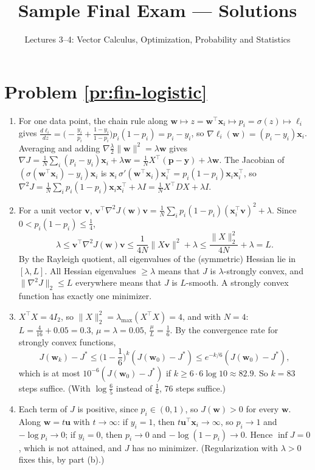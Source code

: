 \documentclass[11pt]{article}
\title{Sample Final Exam --- Solutions}
\author{Lectures 3--4: Vector Calculus, Optimization, Probability and Statistics}
\date{}
\newcommand{\norm}[1]{\lVert #1 \rVert}
\begin{document}
\maketitle

\section*{Problem \ref{pr:fin-logistic}}

\begin{enumerate}[label=(\alph*)]
    \item For one data point, the chain rule along $\mathbf{w} \mapsto z = \mathbf{w}^\top\mathbf{x}_i \mapsto p_i = \sigma(z) \mapsto \ell_i$ gives $\frac{d\ell_i}{dz} = \big(-\frac{y_i}{p_i} + \frac{1 - y_i}{1 - p_i}\big)p_i(1 - p_i) = p_i - y_i$, so $\nabla\ell_i(\mathbf{w}) = (p_i - y_i)\mathbf{x}_i$. Averaging and adding $\nabla\frac{\lambda}{2}\norm{\mathbf{w}}^2 = \lambda\mathbf{w}$ gives $\nabla J = \frac{1}{N}\sum_i(p_i - y_i)\mathbf{x}_i + \lambda\mathbf{w} = \frac{1}{N}X^\top(\mathbf{p} - \mathbf{y}) + \lambda\mathbf{w}$. The Jacobian of $(\sigma(\mathbf{w}^\top\mathbf{x}_i) - y_i)\mathbf{x}_i$ is $\mathbf{x}_i\,\sigma'(\mathbf{w}^\top\mathbf{x}_i)\mathbf{x}_i^\top = p_i(1 - p_i)\mathbf{x}_i\mathbf{x}_i^\top$, so $\nabla^2 J = \frac{1}{N}\sum_i p_i(1 - p_i)\mathbf{x}_i\mathbf{x}_i^\top + \lambda I = \frac{1}{N}X^\top DX + \lambda I$.
    \item For a unit vector $\mathbf{v}$, $\mathbf{v}^\top\nabla^2 J(\mathbf{w})\mathbf{v} = \frac{1}{N}\sum_i p_i(1 - p_i)(\mathbf{x}_i^\top\mathbf{v})^2 + \lambda$. Since $0 < p_i(1 - p_i) \leq \frac{1}{4}$,
    \[\lambda \leq \mathbf{v}^\top\nabla^2 J(\mathbf{w})\mathbf{v} \leq \frac{1}{4N}\norm{X\mathbf{v}}^2 + \lambda \leq \frac{\norm{X}_2^2}{4N} + \lambda = L.\]
    By the Rayleigh quotient, all eigenvalues of the (symmetric) Hessian lie in $[\lambda, L]$. All Hessian eigenvalues $\geq \lambda$ means that $J$ is $\lambda$-strongly convex, and $\norm{\nabla^2 J}_2 \leq L$ everywhere means that $J$ is $L$-smooth. A strongly convex function has exactly one minimizer.
    \item $X^\top X = 4I_2$, so $\norm{X}_2^2 = \lambda_{\max}(X^\top X) = 4$, and with $N = 4$: $L = \frac{4}{16} + 0.05 = 0.3$, $\mu = \lambda = 0.05$, $\frac{\mu}{L} = \frac{1}{6}$. By the convergence rate for strongly convex functions,
    \[J(\mathbf{w}_k) - J^* \leq \Big(1 - \frac{1}{6}\Big)^k(J(\mathbf{w}_0) - J^*) \leq e^{-k/6}(J(\mathbf{w}_0) - J^*),\]
    which is at most $10^{-6}(J(\mathbf{w}_0) - J^*)$ if $k \geq 6 \cdot 6\log 10 \approx 82.9$. So $k = 83$ steps suffice. (With $\log\frac{6}{5}$ instead of $\frac{1}{6}$, $76$ steps suffice.)
    \item Each term of $J$ is positive, since $p_i \in (0, 1)$, so $J(\mathbf{w}) > 0$ for every $\mathbf{w}$. Along $\mathbf{w} = t\mathbf{u}$ with $t \to \infty$: if $y_i = 1$, then $t\mathbf{u}^\top\mathbf{x}_i \to \infty$, so $p_i \to 1$ and $-\log p_i \to 0$; if $y_i = 0$, then $p_i \to 0$ and $-\log(1 - p_i) \to 0$. Hence $\inf J = 0$, which is not attained, and $J$ has no minimizer. (Regularization with $\lambda > 0$ fixes this, by part (b).)
\end{enumerate}
\end{document}
